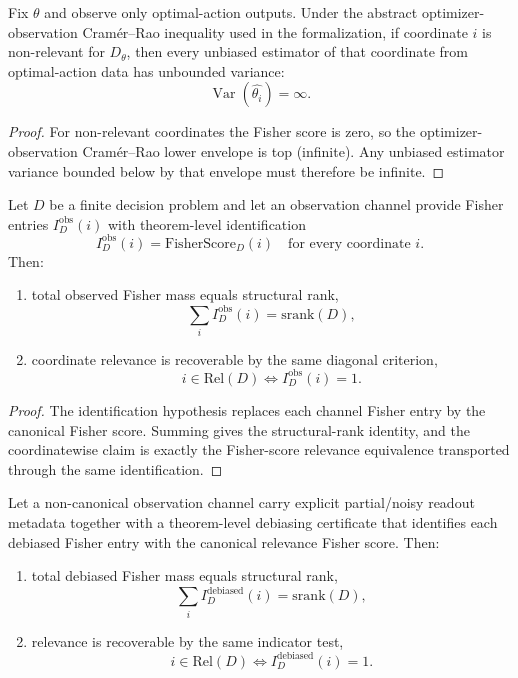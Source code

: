 \begin{theorem}\label{thm:cramer-rao-nonidentifiable-irrelevant}
Fix $\theta$ and observe only optimal-action outputs. Under the abstract optimizer-observation Cram\'er--Rao inequality used in the formalization, if coordinate $i$ is non-relevant for $D_\theta$, then every unbiased estimator of that coordinate from optimal-action data has unbounded variance:
\[
\operatorname{Var}(\widehat{\theta_i})=\infty.
\]
\end{theorem}

\begin{proof}
For non-relevant coordinates the Fisher score is zero, so the optimizer-observation Cram\'er--Rao lower envelope is top (infinite). Any unbiased estimator variance bounded below by that envelope must therefore be infinite.
\end{proof}

\begin{theorem}\label{thm:fisher-observation-channel-transport}
Let $D$ be a finite decision problem and let an observation channel provide Fisher entries $I^{\mathrm{obs}}_D(i)$ with theorem-level identification
\[
I^{\mathrm{obs}}_D(i)=\mathrm{FisherScore}_D(i)
\quad\text{for every coordinate }i.
\]
Then:
\begin{enumerate}
\item total observed Fisher mass equals structural rank,
\[
\sum_i I^{\mathrm{obs}}_D(i)=\mathrm{srank}(D),
\]
\item coordinate relevance is recoverable by the same diagonal criterion,
\[
i\in \mathrm{Rel}(D) \iff I^{\mathrm{obs}}_D(i)=1.
\]
\end{enumerate}
\end{theorem}

\begin{proof}
The identification hypothesis replaces each channel Fisher entry by the canonical Fisher score. Summing gives the structural-rank identity, and the coordinatewise claim is exactly the Fisher-score relevance equivalence transported through the same identification.
\end{proof}

\begin{theorem}\label{thm:fisher-noisy-partial-channel-example}
Let a non-canonical observation channel carry explicit partial/noisy readout metadata together with a theorem-level debiasing certificate that identifies each debiased Fisher entry with the canonical relevance Fisher score. Then:
\begin{enumerate}
\item total debiased Fisher mass equals structural rank,
\[
\sum_i I^{\mathrm{debiased}}_D(i)=\mathrm{srank}(D),
\]
\item relevance is recoverable by the same indicator test,
\[
i\in\mathrm{Rel}(D)\iff I^{\mathrm{debiased}}_D(i)=1.
\]
\end{enumerate}
\end{theorem}


